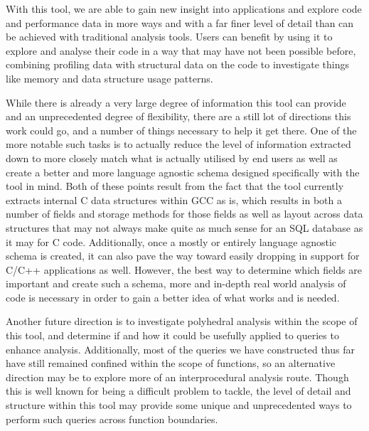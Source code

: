 With this tool, we are able to gain new insight into applications and explore code and performance data in more ways and with a far finer level of detail than can be achieved with traditional analysis tools.
Users can benefit by using it to explore and analyse their code in a way that may have not been possible before, combining profiling data with structural data on the code to investigate things like memory and data structure usage patterns.

While there is already a very large degree of information this tool can provide and an unprecedented degree of flexibility, there are a still lot of directions this work could go, and a number of things necessary to help it get there.
One of the more notable such tasks is to actually reduce the level of information extracted down to more closely match what is actually utilised by end users as well as create a better and more language agnostic schema designed specifically with the tool in mind.
Both of these points result from the fact that the tool currently extracts internal C data structures within \acs{GCC} as is, which results in both a number of fields and storage methods for those fields as well as layout across data structures that may not always make quite as much sense for an \acs{SQL} database as it may for C code.
Additionally, once a mostly or entirely language agnostic schema is created, it can also pave the way toward easily dropping in support for C/C++ applications as well.
However, the best way to determine which fields are important and create such a schema, more and in-depth real world analysis of code is necessary in order to gain a better idea of what works and is needed.

Another future direction is to investigate polyhedral analysis within the scope of this tool, and determine if and how it could be usefully applied to queries to enhance analysis.
Additionally, most of the queries we have constructed thus far have still remained confined within the scope of functions, so an alternative direction may be to explore more of an interprocedural analysis route.
Though this is well known for being a difficult problem to tackle, the level of detail and structure within this tool may provide some unique and unprecedented ways to perform such queries across function boundaries.
